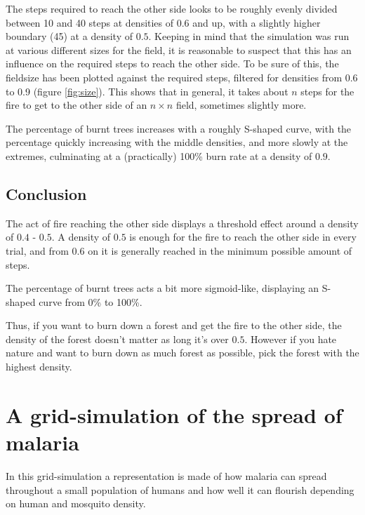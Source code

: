 \documentclass[a4paper]{report}
\begin{document}
The steps required to reach the other side looks to be roughly evenly divided
between 10 and 40 steps at densities of $0.6$ and up, with a slightly higher
boundary (45) at a density of $0.5$. Keeping in mind that the simulation was run
at various different sizes for the field, it is reasonable to suspect that this
has an influence on the required steps to reach the other side. To be sure of
this, the fieldsize has been plotted against the required steps, filtered for
densities from 0.6 to 0.9 (figure \ref{fig:size}). This shows that in general,
it takes about $n$ steps for the fire to get to the other side of an $n \times
n$ field, sometimes slightly more.

The percentage of burnt trees increases with a roughly S-shaped curve, with the
percentage quickly increasing with the middle densities, and more slowly at the
extremes, culminating at a (practically) 100\% burn rate at a density of $0.9$.


\section{Conclusion} 
\label{sec:ff_conc}

The act of fire reaching the other side displays a threshold effect around a
density of $0.4$ - $0.5$. A density of $0.5$ is enough for the fire to reach the
other side in every trial, and from $0.6$ on it is generally reached in the
minimum possible amount of steps.

The percentage of burnt trees acts a bit more sigmoid-like, displaying an
S-shaped curve from 0\% to 100\%.

Thus, if you want to burn down a forest and get the fire to the other side, the
density of the forest doesn't matter as long it's over $0.5$. However if you
hate nature and want to burn down as much forest as possible, pick the forest
with the highest density.



\chapter{A grid-simulation of the spread of malaria}
\label{cha:malaria}

In this grid-simulation a representation is made of how malaria can spread
throughout a small population of humans and how well it can flourish
depending on human and mosquito density. 
\end{document}
